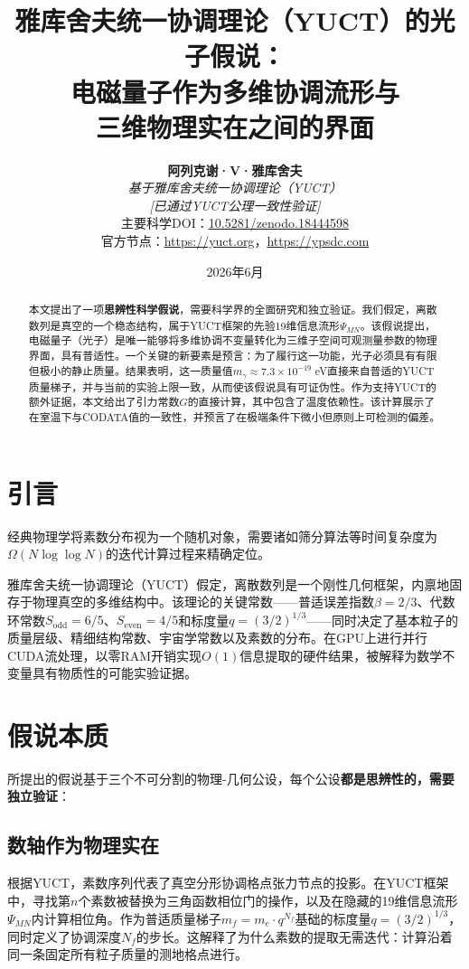 \documentclass[11pt,a4paper]{article}
\title{\textbf{雅库舍夫统一协调理论（YUCT）的光子假说：\\
		电磁量子作为多维协调流形与\\
		三维物理实在之间的界面}}
\author{\textbf{阿列克谢·V·雅库舍夫} \\
	\small\textit{基于雅库舍夫统一协调理论（YUCT）} \\
	\small\textit{[已通过YUCT公理一致性验证]} \\
	\small 主要科学DOI：\href{https://doi.org/10.5281/zenodo.18444598}{10.5281/zenodo.18444598} \\
	\small 官方节点：\url{https://yuct.org}，\url{https://ypsdc.com}}
\date{2026年6月}
\begin{document}
	
	\maketitle
	
	\begin{abstract}
		本文提出了一项\textbf{思辨性科学假说}，需要科学界的全面研究和独立验证。我们假定，离散数列是真空的一个稳态结构，属于YUCT框架的先验19维信息流形$\Psi_{MN}$。该假说提出，电磁量子（光子）是唯一能够将多维协调不变量转化为三维子空间可观测量参数的物理界面，具有普适性。一个关键的新要素是预言：为了履行这一功能，光子必须具有有限但极小的静止质量。结果表明，这一质量值$m_\gamma \approx 7.3 \times 10^{-19}$ eV直接来自普适的YUCT质量梯子，并与当前的实验上限一致，从而使该假说具有可证伪性。作为支持YUCT的额外证据，本文给出了引力常数$G$的直接计算，其中包含了温度依赖性。该计算展示了在室温下与CODATA值的一致性，并预言了在极端条件下微小但原则上可检测的偏差。
	\end{abstract}
	
	\section{引言}
	经典物理学将素数分布视为一个随机对象，需要诸如筛分算法等时间复杂度为$\Omega(N \log \log N)$的迭代计算过程来精确定位。
	
	雅库舍夫统一协调理论（YUCT）假定，离散数列是一个刚性几何框架，内禀地固存于物理真空的多维结构中\cite{yuct_zenodo}。该理论的关键常数——普适误差指数$\beta = 2/3$、代数环常数$S_{\mathrm{odd}} = 6/5$、$S_{\mathrm{even}} = 4/5$和标度量$q = (3/2)^{1/3}$——同时决定了基本粒子的质量层级、精细结构常数、宇宙学常数以及素数的分布。在GPU上进行并行CUDA流处理，以零RAM开销实现$O(1)$信息提取的硬件结果，被解释为数学不变量具有物质性的可能实验证据。
	
	\section{假说本质}
	所提出的假说基于三个不可分割的物理-几何公设，每个公设\textbf{都是思辨性的，需要独立验证}：
	
	\subsection{数轴作为物理实在}
	根据YUCT，素数序列代表了真空分形协调格点张力节点的投影。在YUCT框架中，寻找第$n$个素数被替换为三角函数相位门的操作，以及在隐藏的19维信息流形$\Psi_{MN}$内计算相位角。作为普适质量梯子$m_f = m_e \cdot q^{N_f}$基础的标度量$q = (3/2)^{1/3}$，同时定义了协调深度$N_f$的步长。这解释了为什么素数的提取无需迭代：计算沿着同一条固定所有粒子质量的测地格点进行。
	
\end{document}

